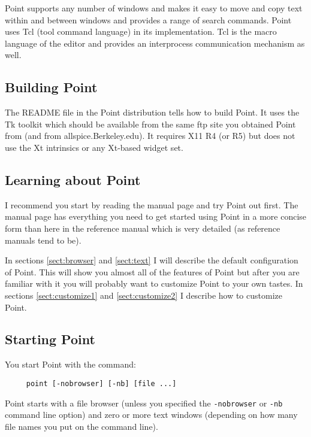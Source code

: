 Point supports any number of windows and makes it easy to move and copy
text within and between windows and provides a range of
search commands.
Point uses Tcl (tool command language) in its implementation.
Tcl is the macro language of the editor and provides an interprocess
communication mechanism as well.



\subsection{Building Point}

The README file in the Point distribution tells how to build Point.
It uses the Tk toolkit which should be available from the same ftp
site you obtained Point from (and from allspice.Berkeley.edu).
It requires X11 R4 (or R5) but does not use the Xt intrinsics
or any Xt-based widget set.



\subsection{Learning about Point}

I recommend you start by reading the manual page and try Point out first.
The manual page has everything you need to get started using Point
in a more concise form than here in the reference manual which is
very detailed (as reference manuals tend to be).

In  sections \ref{sect:browser} and \ref{sect:text}
I will describe the default configuration of Point.
This will show you almost all of the features of Point but after
you are familiar with it you will probably want to customize
Point to your own tastes.
In sections \ref{sect:customize1} and \ref{sect:customize2}
I describe how to customize Point.


\subsection{Starting Point}

You start Point with the command:
\begin{verbatim}
     point [-nobrowser] [-nb] [file ...]
\end{verbatim}

Point starts with a file browser (unless you specified the
{\tt -nobrowser} or {\tt -nb} command line option) and zero
or more text windows (depending on how many file names you
put on the command line).

